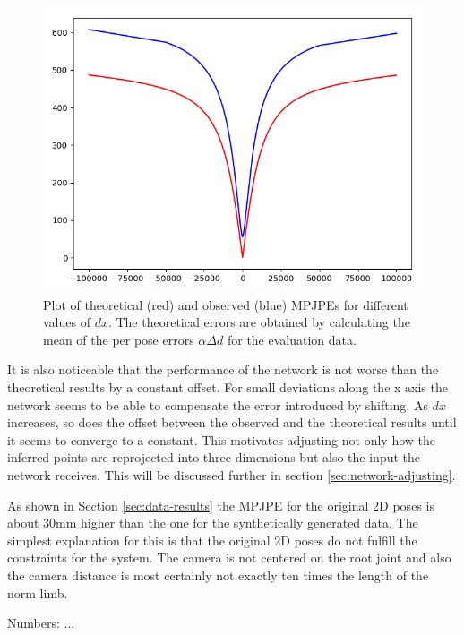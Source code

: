 \begin{figure}[ht]	
	\centering
	\includegraphics[scale=0.5]{images/x_shift_error.png}
	\caption{Plot of theoretical (red) and observed (blue) MPJPEs for different values of $dx$. 
		The theoretical errors are obtained by calculating the mean of the per pose errors $\alpha \Delta d$ for the evaluation data.}
	\label{fig:x-shift-error}
\end{figure}

It is also noticeable that the performance of the network is not worse than the theoretical results by a constant offset.
For small deviations along the x axis the network seems to be able to compensate the error introduced by shifting.
As $dx$ increases, so does the offset between the observed and the theoretical results until it seems to converge to a constant.
This motivates adjusting not only how the inferred points are reprojected into three dimensions but also the input the network receives.
This will be discussed further in section \ref{sec:network-adjusting}.

As shown in Section \ref{sec:data-results} the MPJPE for the original 2D poses is about  30mm higher than the one for the synthetically generated data.
The simplest explanation for this is that the original 2D poses do not fulfill the constraints for the system.
The camera is not centered on the root joint and also the camera distance is most certainly not exactly ten times the length of the norm limb.

Numbers: ...
	

